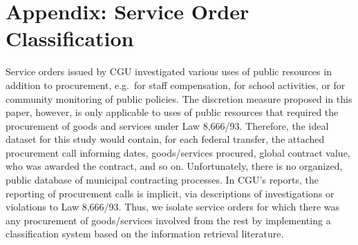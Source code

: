 \documentclass[11pt]{article}
\begin{document}


\setlength\bibsep{0pt}



\clearpage







\clearpage

\appendix

\section{Appendix: Service Order Classification} \label{sec:appendixA}

Service orders issued by CGU investigated various uses of public resources in addition to procurement, e.g.~for staff compensation, for school activities, or for community monitoring of public policies. The discretion measure proposed in this paper, however, is only applicable to uses of public resources that required the procurement of goods and services under Law 8,666/93. Therefore, the ideal dataset for this study would contain, for each federal transfer, the attached procurement call informing dates, goods/services procured, global contract value, who was awarded the contract, and so on. Unfortunately, there is no organized, public database of municipal contracting processes. In CGU's reports, the reporting of procurement calls is implicit, via descriptions of investigations or violations to Law 8,666/93. Thus, we isolate service orders for which there was any procurement of goods/services involved from the rest by implementing a classification system based on the information retrieval literature.
\end{document}
